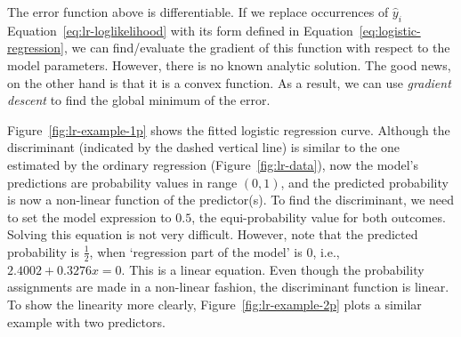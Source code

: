 The error function above is differentiable.
If we replace occurrences of $\hat{y}_{i}$  Equation~\ref{eq:lr-loglikelihood}
with its form defined in Equation~\ref{eq:logistic-regression},
we can find/evaluate the gradient of this function
with respect to the model parameters.
However, there is no known analytic solution.
The good news, on the other hand is that it is a convex function.
As a result, we can use \emph{gradient descent} to find the global minimum of the error.


\xdef\lrslope{2.4002}
\xdef\lrinterc{0.3276}
\begin{marginfigure}
  \caption{\label{fig:lr-example-1p}%
    The logistic regression fitted to the data presented in Figure~\ref{fig:lr-data}.
    The resulting logistic curve is the blue curve,
    which is $\hat{y} = \dfrac{1}{1 + e^{\num{\lrinterc} + \num{\lrslope} x}}$.
  }
\end{marginfigure}

Figure~\ref{fig:lr-example-1p} shows the fitted logistic regression curve.
Although the discriminant (indicated by the dashed vertical line) is similar
to the one estimated by the ordinary regression (Figure~\ref{fig:lr-data}),
now the model's predictions are probability values in range $(0,1)$,
and the predicted probability is now a non-linear function of the predictor(s).
To find the discriminant,
we need to set the model expression to $0.5$,
the equi-probability value for both outcomes.
Solving this equation is not very difficult.
However, note that the predicted probability is $\frac{1}{2}$,
when `regression part of the model' is \num{0},
i.e., $\num{\lrslope} + \num{\lrinterc} x = 0$.
This is a linear equation.
Even though the probability assignments are
made in a non-linear fashion,
the discriminant function is linear.
To show the linearity more clearly,
Figure~\ref{fig:lr-example-2p} plots a similar example
with two predictors.

